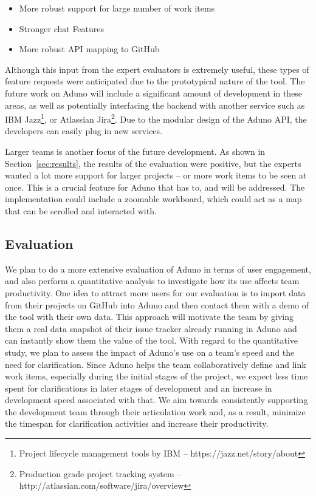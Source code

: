 \documentclass[conference]{IEEEtran}
\begin{document}
\begin{itemize}
    \item{More robust support for large number of work items}
    \item{Stronger chat Features} 
    \item{More robust API mapping to GitHub}
\end{itemize}

Although this input from the expert evaluators is extremely useful, these types of feature requests were anticipated due to the prototypical nature of the tool.  The future work on Aduno will include a significant amount of development in these areas, as well as potentially interfacing the backend with another service such as IBM Jazz\footnote{Project lifecycle management tools by IBM -- https://jazz.net/story/about}, or Atlassian Jira\footnote{Production grade project tracking system -- http://atlassian.com/software/jira/overview}. Due to the modular design of the Aduno API, the developers can easily plug in new services.  

Larger teams is another focus of the future development.  As shown in Section~\ref{sec:results}, the results of the evaluation were positive, but the experts wanted a lot more support for larger projects -- or more work items to be seen at once.  This is a crucial feature for Aduno that has to, and will be addressed.  The implementation could include a zoomable workboard, which could act as a map that can be scrolled and interacted with.   

\subsection{Evaluation}
We plan to do a more extensive evaluation of Aduno in terms of user engagement, and also perform a quantitative analysis to investigate how its use affects team productivity. One idea to attract more users for our evaluation is to import data from their projects on GitHub into Aduno and then contact them with a demo of the tool with their own data. This approach will motivate the team by giving them a real data snapshot of their issue tracker already running in Aduno and can instantly show them the value of the tool.  With regard to the quantitative study, we plan to assess the impact of Aduno's use on a team's speed and the need for clarification. Since Aduno helps the team collaboratively define and link work items, especially during the initial stages of the project, we expect less time spent for clarifications in later stages of development and an increase in development speed associated with that. We aim towards consistently supporting the development team through their articulation work and, as a result, minimize the timespan for clarification activities and increase their productivity.
\end{document}
